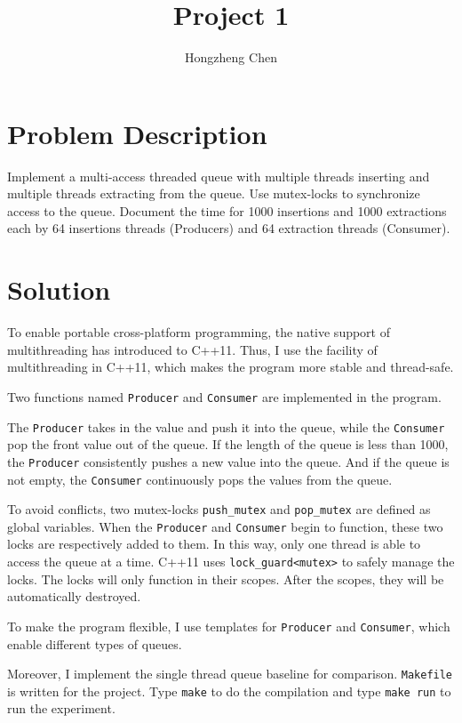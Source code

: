 \documentclass[english]{thesis}
\title{Project 1}
\author{Hongzheng Chen}
\begin{document}
\maketitle

\section{Problem Description}
Implement a multi-access threaded queue with multiple threads inserting and multiple threads extracting from the queue. Use mutex-locks to synchronize access to the queue. Document the time for 1000 insertions and 1000 extractions each by 64 insertions threads (Producers) and 64 extraction threads (Consumer).

\section{Solution}
To enable portable cross-platform programming, the native support of multithreading has introduced to C++11.
Thus, I use the facility of multithreading in C++11, which makes the program more stable and thread-safe.

Two functions named \verb'Producer' and \verb'Consumer' are implemented in the program.

The \verb'Producer' takes in the value and push it into the queue, while the \verb'Consumer' pop the front value out of the queue.
If the length of the queue is less than 1000, the \verb'Producer' consistently pushes a new value into the queue.
And if the queue is not empty, the \verb'Consumer' continuously pops the values from the queue.

To avoid conflicts, two mutex-locks \verb'push_mutex' and \verb'pop_mutex' are defined as global variables.
When the \verb'Producer' and \verb'Consumer' begin to function, these two locks are respectively added to them.
In this way, only one thread is able to access the queue at a time.
C++11 uses \verb'lock_guard<mutex>' to safely manage the locks.
The locks will only function in their scopes.
After the scopes, they will be automatically destroyed.

To make the program flexible, I use templates for \verb'Producer' and \verb'Consumer', which enable different types of queues.

Moreover, I implement the single thread queue baseline for comparison.
\verb'Makefile' is written for the project.
Type \verb'make' to do the compilation and type \verb'make run' to run the experiment.
\end{document}
